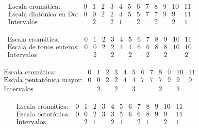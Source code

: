         $$\left.\begin{matrix}
        \text{Escala cromática:}&0&1&2&3&4&5&6&7&8&9&10&11\\
        \text{Escala diatónica en Do:}&0&0&2&2&4&5&5&7&7&9&9&11\\
        \text{Intervalos}&&2&&2&1&&2&&2&&2&1\\
        \end{matrix}\right.$$

        $$\left.\begin{matrix}
        \text{Escala cromática:}&0&1&2&3&4&5&6&7&8&9&10&11\\
        \text{Escala de tonos enteros:}&0&0&2&2&4&4&6&6&8&8&10&10\\
        \text{Intervalos}&&2&&2&&2&&2&&2&&2\\
        \end{matrix}\right.$$

        $$\left.\begin{matrix}
        \text{Escala cromática:}&0&1&2&3&4&5&6&7&8&9&10&11\\
        \text{Escala pentatónica mayor:}&0&0&2&2&4&4&7&7&7&9&9&0\\
        \text{Intervalos}&&2&&2&&3&&&2&&3&\\
        \end{matrix}\right.$$
        
        $$\left.\begin{matrix}
        \text{Escala cromática:}&0&1&2&3&4&5&6&7&8&9&10&11\\
        \text{Escala octotónica:}&0&0&2&3&3&5&6&6&8&9&9&11\\
        \text{Intervalos}&&2&1&&2&1&&2&1&&2&1\\
        \end{matrix}\right.$$

